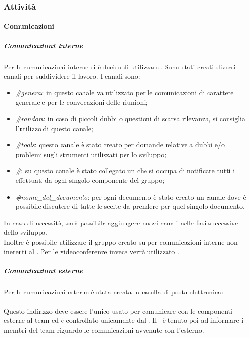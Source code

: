\subsubsection{Attività}
	\paragraph{Comunicazioni}
		\subparagraph{Comunicazioni interne}
		Per le comunicazioni interne si è deciso di utilizzare . Sono stati creati diversi canali per suddividere il lavoro. I canali sono:
		\begin{itemize}
			\item \textit{\#general}: in questo canale va utilizzato per le comunicazioni di carattere generale e per le convocazioni delle riunioni; 
			\item \textit{\#random}: in caso di piccoli dubbi o questioni di scarsa rilevanza, si consiglia l'utilizzo di questo canale; 
			\item \textit{\#tools}: questo canale è stato creato per domande relative a dubbi e/o problemi sugli strumenti utilizzati per lo sviluppo;
			\item \textit{\#}: su questo canale è stato collegato un  che si occupa di notificare tutti i  effettuati da ogni singolo componente del gruppo;
			\item \textit{\#nome\_del\_documento}: per ogni documento è stato creato un canale dove è possibile discutere di tutte le scelte da prendere per quel singolo documento.
		\end{itemize}
		In caso di necessità, sarà possibile aggiungere nuovi canali nelle fasi successive dello sviluppo. \\
		Inoltre è possibile utilizzare il gruppo creato su  per comunicazioni interne non inerenti al . Per le videoconferenze invece verrà utilizzato .
		\subparagraph{Comunicazioni esterne}
		Per le comunicazioni esterne è stata creata la casella di posta elettronica: \\
		\highlight{\EMAIL}\\
		Questo indirizzo deve essere l'unico usato per comunicare con le componenti esterne al team ed è controllato unicamente dal \RES. Il \RES  \ è tenuto poi ad informare i membri del team riguardo le comunicazioni avvenute con l'esterno.
